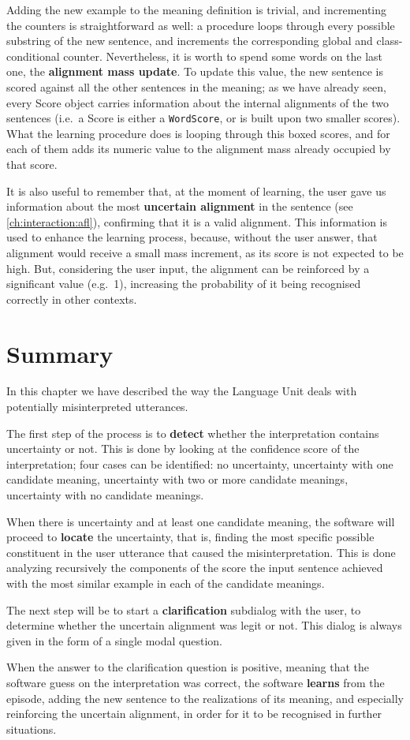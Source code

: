 Adding the new example to the meaning definition is trivial, and incrementing the counters is straightforward as well: a procedure loops through every possible substring of the new sentence, and increments the corresponding global and class-conditional counter. Nevertheless, it is worth to spend some words on the last one, the \textbf{alignment mass update}. To update this value, the new sentence is scored against all the other sentences in the meaning; as we have already seen, every Score object carries information about the internal alignments of the two sentences (i.e.\ a Score is either a \texttt{WordScore}, or is built upon two smaller scores). What the learning procedure does is looping through this boxed scores, and for each of them adds its numeric value to the alignment mass already occupied by that score.

It is also useful to remember that, at the moment of learning, the user gave us information about the most \textbf{uncertain alignment} in the sentence (see \ref{ch:interaction:afl}), confirming that it is a valid alignment. This information is used to enhance the learning process, because, without the user answer, that alignment would receive a small mass increment, as its score is not expected to be high. But, considering the user input, the alignment can be reinforced by a significant value (e.g.\ 1), increasing the probability of it being recognised correctly in other contexts.

\section{Summary}
In this chapter we have described the way the Language Unit deals with potentially misinterpreted utterances.

The first step of the process is to \textbf{detect} whether the interpretation contains uncertainty or not. This is done by looking at the confidence score of the interpretation; four cases can be identified: no uncertainty, uncertainty with one candidate meaning, uncertainty with two or more candidate meanings, uncertainty with no candidate meanings.

When there is uncertainty and at least one candidate meaning, the software will proceed to \textbf{locate} the uncertainty, that is, finding the most specific possible constituent in the user utterance that caused the misinterpretation. This is done analyzing recursively the components of the score the input sentence achieved with the most similar example in each of the candidate meanings.

The next step will be to start a \textbf{clarification} subdialog with the user, to determine whether the uncertain alignment was legit or not. This dialog is always given in the form of a single modal question.

When the answer to the clarification question is positive, meaning that the software guess on the interpretation was correct, the software \textbf{learns} from the episode, adding the new sentence to the realizations of its meaning, and especially reinforcing the uncertain alignment, in order for it to be recognised in further situations.